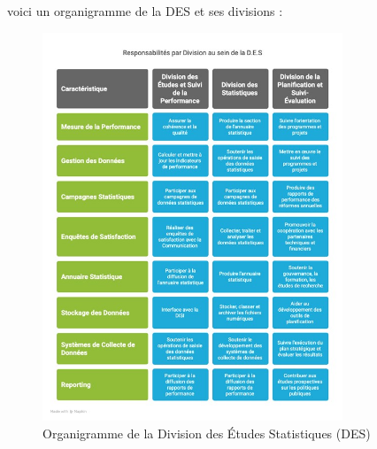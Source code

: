 voici un organigramme de la DES  et ses divisions :
\begin{figure}
    \centering
    \includegraphics[width=0.8\textwidth]{image/des.jpg}
    \caption{Organigramme de la Division des Études Statistiques (DES)}
    \label{fig:organigramme_DES}
\end{figure} 